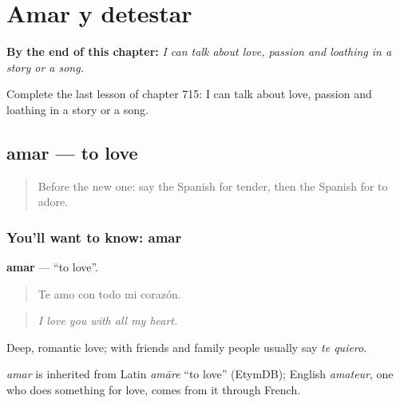 
\chapter{Amar y detestar}
\label{ch:es-amar-y-detestar}

\begin{chapteropening}
\textbf{By the end of this chapter:} \emph{I can talk about love, passion and loathing in a story or a song.}

Complete the last lesson of chapter 715: I can talk about love, passion and loathing in a story or a song.
\end{chapteropening}

\section[amar]{amar — to love}

\label{lesson:ES-C715-amar}



\begin{quote}
Before the new one: say the Spanish for tender, then the Spanish for to adore.
\end{quote}

\subsection*{You'll want to know: amar}
\textbf{amar} — \textquotedblleft{}to love\textquotedblright{}.

\begin{quote}
Te amo con todo mi corazón.
\end{quote}

\begin{quote}
\emph{I love you with all my heart.}
\end{quote}

Deep, romantic love; with friends and family people usually say \emph{te quiero}.

\begin{cousinweb}
\emph{amar} is inherited from Latin \emph{amāre} \textquotedblleft{}to love\textquotedblright{} (EtymDB); English \emph{amateur}, one who does something for love, comes from it through French.
\end{cousinweb}

